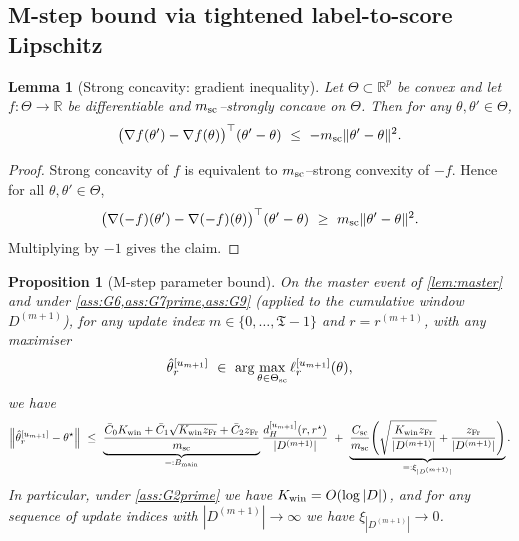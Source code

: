 \documentclass{statsoc}
\newtheorem{lemma}[lemma]{Lemma}
\newtheorem{proposition}[proposition]{Proposition}
\newcommand{\norm}[1]{\left\lVert #1 \right\rVert}
\newcommand{\bbR}{\mathbb{R}}
\newcommand{\1}{\mathbbm{1}}
\newcommand{\Tmax}{\mathfrak{T}}
\begin{document}
\subsection{M-step bound via tightened label-to-score Lipschitz}\label{sec:Mstep}

\begin{lemma}[Strong concavity: gradient inequality]\label{lem:sc-mon}
Let $\Theta\subset\bbR^p$ be convex and let $f:\Theta\to\bbR$ be differentiable and $m_{\rm sc}$--strongly concave on
$\Theta$. Then for any $\theta,\theta'\in\Theta$,
\[
\big(\nabla f(\theta')-\nabla f(\theta)\big)^\top(\theta'-\theta)\ \le\ -m_{\rm sc}\|\theta'-\theta\|^2.
\]
\end{lemma}

\begin{proof}
Strong concavity of $f$ is equivalent to $m_{\rm sc}$--strong convexity of $-f$. Hence for all $\theta,\theta'\in\Theta$,
\[
\big(\nabla(-f)(\theta')-\nabla(-f)(\theta)\big)^\top(\theta'-\theta)\ \ge\ m_{\rm sc}\|\theta'-\theta\|^2.
\]
Multiplying by $-1$ gives the claim.
\end{proof}


\begin{proposition}[M-step parameter bound]\label{prop:Mstep}
On the master event of \cref{lem:master} and under \cref{ass:G6,ass:G7prime,ass:G9} (applied to the cumulative window $D^{(m+1)}$),
for any update index $m\in\{0,\dots,\Tmax-1\}$ and $r=r^{(m+1)}$, with any maximiser
\[
\hat\theta_r^{[u_{m+1}]}\ \in\ \arg\max_{\theta\in\Theta_{\rm sc}}\ell_r^{[u_{m+1}]}(\theta),
\]
we have
\[
\norm{\hat\theta_r^{[u_{m+1}]}-\theta^\star}\ \le\ 
\underbrace{\frac{\bar C_0 K_{\rm win}+\bar C_1\sqrt{K_{\rm win} z_{\rm Fr}}+\bar C_2 z_{\rm Fr}}{m_{\rm sc}}}_{=:B_{\rm main}}
\frac{d_H^{[u_{m+1}]}(r,r^\star)}{|D^{(m+1)}|}
\ +\ 
\underbrace{\frac{C_{\rm sc}}{m_{\rm sc}}\!\left(\sqrt{\frac{K_{\rm win} z_{\rm Fr}}{|D^{(m+1)}|}} + \frac{z_{\rm Fr}}{|D^{(m+1)}|}\right)}_{=:\xi_{|D^{(m+1)}|}}.
\]
In particular, under \cref{ass:G2prime} we have $K_{\rm win}=O(\log|D|)$, and for any sequence of update indices
with $|D^{(m+1)}|\to\infty$ we have $\xi_{|D^{(m+1)}|}\to 0$.
\end{proposition}
\end{document}
